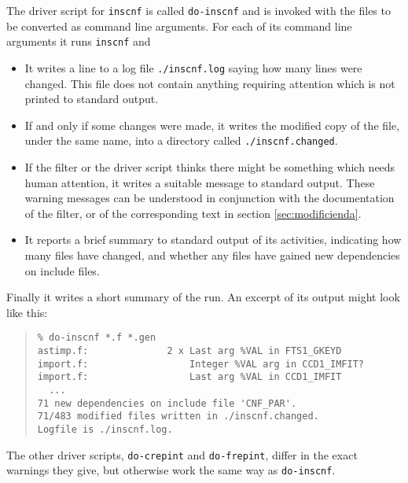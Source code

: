 \documentclass[twoside,11pt]{article}
\newcommand{\htmlref}[2]{#1}
\renewcommand{\_}{\texttt{\symbol{95}}}
\newcommand{\xroutine}[1]{\htmlref{{\tt #1}}{#1}}
\newcommand{\xdofilter}[1]{\htmlref{{\tt do-#1}}{do-xxx}}
\newcommand{\file}[1]{{\tt #1}}
\newcommand{\dofilter}[1]{{\tt do-#1}}
\newenvironment{squote}{\begin{quote}\begin{small}}{\end{small}\end{quote}}
\begin{document}
The driver script for \xroutine{inscnf} is called \xdofilter{inscnf}
and is invoked with the files to be converted as command line arguments.
For each of its command line arguments it runs \xroutine{inscnf} and
\begin{itemize}
\item It writes a line to a log file \file{./inscnf.log} 
      saying how many lines were changed.  This file does not contain
      anything requiring attention which is not printed to standard output.
\item If and only if some changes were made, it writes the modified copy
      of the file, under the same name, 
      into a directory called \file{./inscnf.changed}.
\item If the filter or the driver script thinks there might be something 
      which needs human attention, it writes a suitable message to standard
      output.  These warning messages can be understood in conjunction 
      with the documentation of the filter, or of the corresponding 
      text in section \ref{sec:modificienda}.
\item It reports a brief summary to standard output of its activities,
      indicating how many files have changed, and whether any files have
      gained new dependencies on include files.
\end{itemize}
Finally it writes a short summary of the run.
An excerpt of its output might look like this:
\begin{squote}
\begin{verbatim}
% do-inscnf *.f *.gen
astimp.f:              2 x Last arg %VAL in FTS1_GKEYD
import.f:                  Integer %VAL arg in CCD1_IMFIT?
import.f:                  Last arg %VAL in CCD1_IMFIT
  ...
71 new dependencies on include file 'CNF_PAR'.
71/483 modified files written in ./inscnf.changed.
Logfile is ./inscnf.log.
\end{verbatim}
\end{squote}

The other driver scripts, \dofilter{crepint} and \dofilter{frepint},
differ in the exact warnings they give, but otherwise work the
same way as \dofilter{inscnf}.
\end{document}
